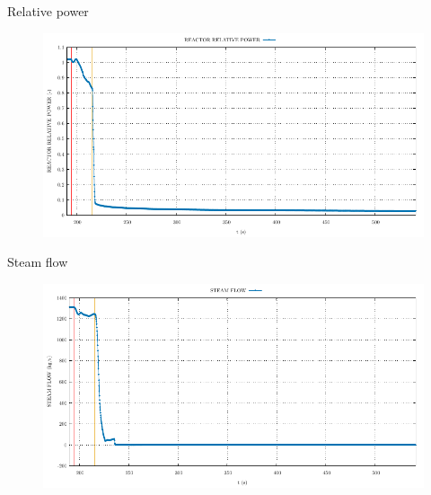 \begin{frame}{Relative power}
	\begin{figure}
		\centering
		\includegraphics[width=\textwidth]{./graphs/REACTOR RELATIVE POWER_comp.pdf}
		
	\end{figure}
\end{frame}




\begin{frame}{Steam flow}
	\begin{figure}
		\centering
		\includegraphics[width=\textwidth]{./graphs/STEAM FLOW_comp.pdf}
		
	\end{figure}

\end{frame}

